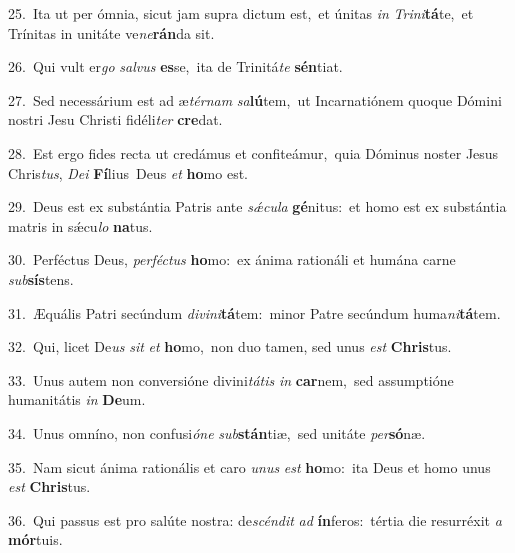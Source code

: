 {\numbfont\textcolor{\numbcolor}{25.}}~Ita ut per ómnia, sicut jam supra dictum est,~\dagger et únitas \textit{in} \textit{Tri}\-\textit{ni}\textbf{tá}te,~\star et Trínitas in unitáte ve\-\textit{ne}\-\textbf{rán}da sit.\par
{\numbfont\textcolor{\numbcolor}{26.}}~Qui vult er\textit{go} \textit{sal}\-\textit{vus} \textbf{es}\-se,~\star ita de Trinitá\textit{te} \textbf{sén}\-tiat.\par
{\numbfont\textcolor{\numbcolor}{27.}}~Sed necessárium est ad æ\-\textit{tér}\-\textit{nam} \textit{sa}\-\textbf{lú}tem,~\star ut Incarnatiónem quoque Dómini nostri Jesu Christi fidéli\textit{ter} \textbf{cre}\-dat.\par
{\numbfont\textcolor{\numbcolor}{28.}}~Est ergo fides recta ut credámus et confiteámur,~\dagger quia Dóminus noster Jesus Chris\-\textit{tus}\-, \textit{De}\-\textit{i} \textbf{Fí}\-lius~\star Deus \textit{et} \textbf{ho}\-mo est.\par
{\numbfont\textcolor{\numbcolor}{29.}}~Deus est ex substántia Patris ante \textit{sǽ}\-\textit{cu}\textit{la} \textbf{gé}\-nitus:~\star et homo est ex substántia matris in sǽcu\textit{lo} \textbf{na}\-tus.\par
{\numbfont\textcolor{\numbcolor}{30.}}~Perféctus Deus, \textit{per}\-\textit{féc}\textit{tus} \textbf{ho}\-mo:~\star ex ánima rationáli et humána carne \textit{sub}\-\textbf{sís}tens.\par
{\numbfont\textcolor{\numbcolor}{31.}}~Æquális Patri secúndum \textit{di}\-\textit{vi}\textit{ni}\textbf{tá}tem:~\star minor Patre secúndum huma\-\textit{ni}\-\textbf{tá}tem.\par
{\numbfont\textcolor{\numbcolor}{32.}}~Qui, licet De\textit{us} \textit{sit} \textit{et} \textbf{ho}\-mo,~\star non duo tamen, sed unus \textit{est} \textbf{Chris}\-tus.\par
{\numbfont\textcolor{\numbcolor}{33.}}~Unus autem non conversióne divini\-\textit{tá}\-\textit{tis} \textit{in} \textbf{car}\-nem,~\star sed assumptióne humanitátis \textit{in} \textbf{De}\-um.\par
{\numbfont\textcolor{\numbcolor}{34.}}~Unus omníno, non confusi\-\textit{ó}\-\textit{ne} \textit{sub}\-\textbf{stán}tiæ,~\star sed unitáte \textit{per}\-\textbf{só}næ.\par
{\numbfont\textcolor{\numbcolor}{35.}}~Nam sicut ánima rationális et caro \textit{u}\-\textit{nus} \textit{est} \textbf{ho}\-mo:~\star ita Deus et homo unus \textit{est} \textbf{Chris}\-tus.\par
{\numbfont\textcolor{\numbcolor}{36.}}~Qui passus est pro salúte nostra: de\-\textit{scén}\-\textit{dit} \textit{ad} \textbf{ín}\-feros:~\star tértia die resurréxit \textit{a} \textbf{mór}\-tuis.\par

